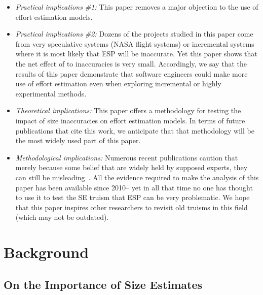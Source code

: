 \documentclass[final,twocolumn]{elsarticle}
\newcommand{\bi}{\begin{itemize}[leftmargin=0.4cm]}
\newcommand{\ei}{\end{itemize}}
\theoremstyle{break}
\begin{document}
\bi
\item {\em Practical implications \#1:} This paper removes
  a major objection to the use of effort estimation models.
\item {\em Practical implications \#2:} Dozens of the projects studied in this paper come from very speculative systems (NASA flight systems) or incremental
  systems where it is most likely that ESP will be inaccurate. Yet this paper shows that the net effect
  of to inaccuracies is very small.
  Accordingly, we say that
  the results of this paper demonstrate
  that software engineers could make more use of effort estimation even when exploring incremental or highly experimental methods. 
  \item {\em Theoretical implications:} This paper offers a methodology for testing the impact
  of size inaccuracies on effort estimation models. In terms of 
  future publications that cite this work, we anticipate that that 
  methodology will be the most widely used part of this paper.
  \item {\em Methodological implications:}
   Numerous
  recent publications caution that merely because some  belief that are widely held by
  supposed  experts, they can still be misleading~\cite{jorgensen09,Menzies2016,Menzies2016b,passos11,prem16,betten14,yang13,me12d,ray2014lang}.  
   All the evidence required to make the analysis of
  this paper has been available since  2010-- yet in all that
  time no one has thought to use it to test the
  SE truism that  ESP can be very problematic.
  We hope that this paper inspires other researchers to revisit
  old truisms in this field (which may not be outdated).
  \ei
  
  
  \section{Background}
  



\subsection{On the Importance of Size Estimates}
\end{document}
